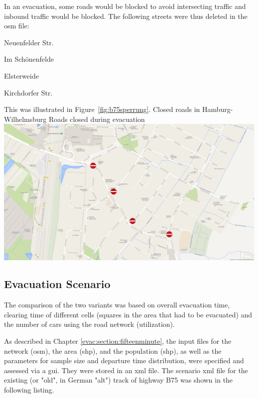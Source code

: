In an evacuation, some roads would be blocked to avoid intersecting traffic and inbound traffic would be blocked. The following streets were thus deleted in the \gls{osm} file:
%
\begin{compactitem}
	\item Neuenfelder Str. 
	\item Im Schönenfelde
	\item Elsterweide
	\item Kirchdorfer Str.
\end{compactitem}
%
This was illustrated in Figure~\ref{fig:b75sperrung}.
%
%
\createfigure%
{Closed roads in Hamburg-Wilhelmsburg}%
{Roads closed during evacuation}%
{\label{fig:b75sperrung}}%
{\includegraphics[width=0.7\linewidth]{using/figures/B75sperrung}}%
{}

\subsection{Evacuation Scenario}
The comparison of the two variants was based on overall evacuation time, clearing time of different cells (squares in the area that had to be evacuated) and the number of cars using the road network (utilization).

As described in Chapter \ref{evac:section:fifteenminute}, the input files for the network (\gls{osm}), the area (shp), and the population (shp), as well as the parameters for sample size and departure time distribution, were specified and assessed via a \gls{gui}. They were stored in an \gls{xml} file. The scenario \gls{xml} file for the existing (or "old", in German "alt") track of highway B75 was shown in the following listing. 



